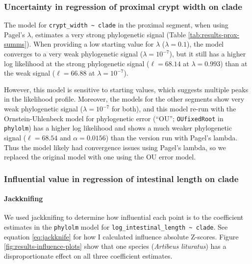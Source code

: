 \documentclass[12pt,]{article}
\let\oldparagraph\paragraph
\renewcommand{\paragraph}[1]{\oldparagraph{#1}\mbox{}}
\begin{document}
\clearpage

\hypertarget{uncertainty-in-regression-of-proximal-crypt-width-on-clade}{%
\subsubsection{Uncertainty in regression of proximal crypt width on clade}\label{uncertainty-in-regression-of-proximal-crypt-width-on-clade}}

The model for \texttt{crypt\_width\ \textasciitilde{}\ clade} in the proximal segment, when using Pagel's
\(\lambda\), estimates a very strong phylogenetic signal
(Table \ref{tab:results-prox-summs}).
When providing a low starting value for \(\lambda\) (\(\lambda = 0.1\)),
the model converges to a very weak phylogenetic signal (\(\lambda = 10^{-7}\)),
but it still has a higher log likelihood at the strong phylogenetic signal
(\(\ell = 68.14\) at \(\lambda = 0.993\)) than at the weak signal
(\(\ell = 66.88\) at \(\lambda = 10^{-7}\)).

However, this model is sensitive to starting values, which suggests multiple peaks in
the likelihood profile.
Moreover, the models for the other segments show very weak phylogenetic signal
(\(\lambda = 10^{-7}\) for both),
and this model re-run with the Ornstein-Uhlenbeck model for phylogenetic error
(``OU''; \texttt{OUfixedRoot} in \texttt{phylolm}) has a higher log likelihood and
shows a much weaker phylogenetic signal (\(\ell = 68.54\) and \(\alpha = 0.0156\)) than
the version run with Pagel's lambda.
Thus the model likely had convergence issues using Pagel's lambda, so we
replaced the original model with one using the OU error model.

\hypertarget{influential-value-in-regression-of-intestinal-length-on-clade}{%
\subsubsection{Influential value in regression of intestinal length on clade}\label{influential-value-in-regression-of-intestinal-length-on-clade}}

\hypertarget{jackknifing-1}{%
\paragraph{Jackknifing}\label{jackknifing-1}}

We used jackknifing to determine how influential each point is to the coefficient
estimates in the \texttt{phylolm} model for \texttt{log\_intestinal\_length\ \textasciitilde{}\ clade}.
See equation \ref{eq:jackknife} for how I calculated influence absolute Z-scores.
Figure \ref{fig:results-influence-plots}
show that one species (\emph{Artibeus lituratus}) has a disproportionate effect on all
three coefficient estimates.
\end{document}
